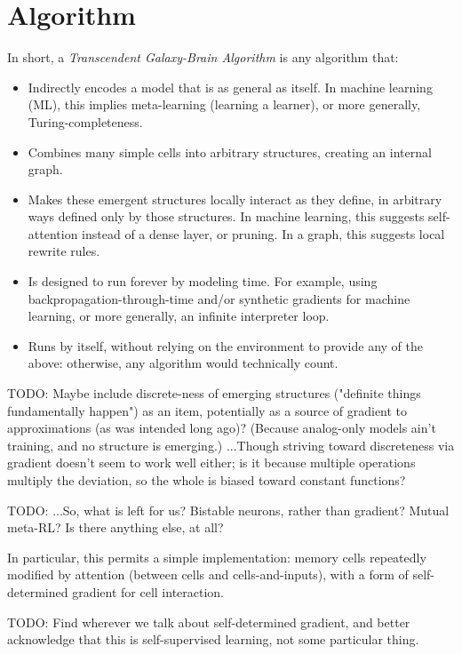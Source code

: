 \documentclass{article}
\begin{document}
\section{Algorithm}

In short, a \textit{Transcendent Galaxy-Brain Algorithm} is any algorithm that:

\begin{itemize}
\item Indirectly encodes a model that is as general as itself. In machine learning (ML), this implies meta-learning (learning a learner), or more generally, Turing-completeness.
\item Combines many simple cells into arbitrary structures, creating an internal graph.
\item Makes these emergent structures locally interact as they define, in arbitrary ways defined only by those structures. In machine learning, this suggests self-attention instead of a dense layer, or pruning. In a graph, this suggests local rewrite rules.
\item Is designed to run forever by modeling time. For example, using backpropagation-through-time and/or synthetic gradients for machine learning, or more generally, an infinite interpreter loop.
\item Runs by itself, without relying on the environment to provide any of the above: otherwise, any algorithm would technically count.
\end{itemize}

    TODO: Maybe include discrete-ness of emerging structures ("definite things fundamentally happen") as an item, potentially as a source of gradient to approximations (as was intended long ago)? (Because analog-only models ain't training, and no structure is emerging.) ...Though striving toward discreteness via gradient doesn't seem to work well either; is it because multiple operations multiply the deviation, so the whole is biased toward constant functions?

    TODO: ...So, what is left for us? Bistable neurons, rather than gradient? Mutual meta-RL? Is there anything else, at all?

In particular, this permits a simple implementation: memory cells repeatedly modified by attention (between cells and cells-and-inputs), with a form of self-determined gradient for cell interaction.

    TODO: Find wherever we talk about self-determined gradient, and better acknowledge that this is self-supervised learning, not some particular thing.
\end{document}
